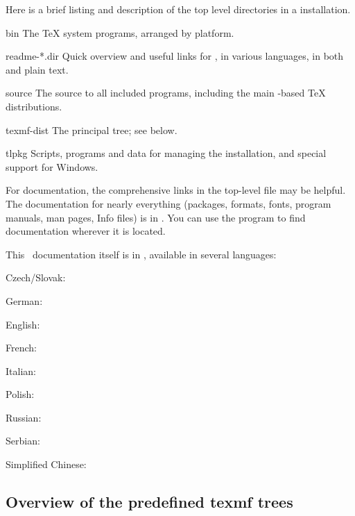 \documentclass{article}
\begin{document}
Here is a brief listing and description of the top level directories in a
\TL{} installation.  

\begin{ttdescription}
\item[bin] The \TeX{} system programs, arranged by platform.
%
\item[readme-*.dir] Quick overview and useful links for \TL{},
in various languages, in both \HTML{} and plain text.
%
\item[source] The source to all included programs, including the main
  \Webc{}-based \TeX{} distributions.
%
\item[texmf-dist] The principal tree; see  below.
%
\item[tlpkg] Scripts, programs and data for managing the
  installation, and special support for Windows.
\end{ttdescription}

For documentation, the comprehensive links in the top-level file
 may be helpful.  The documentation for nearly everything
(packages, formats, fonts, program manuals, man pages, Info files) is in
.  You can use the  program to
find documentation wherever it is located.

This \TL\ documentation itself is in ,
available in several languages:

\begin{itemize*}
\item{Czech/Slovak:} 
\item{German:} 
\item{English:} 
\item{French:} 
\item{Italian:} 
\item{Polish:} 
\item{Russian:} 
\item{Serbian:} 
\item{Simplified Chinese:} 
\end{itemize*}

\subsection{Overview of the predefined texmf trees}
\label{sec:texmftrees}
\end{document}
